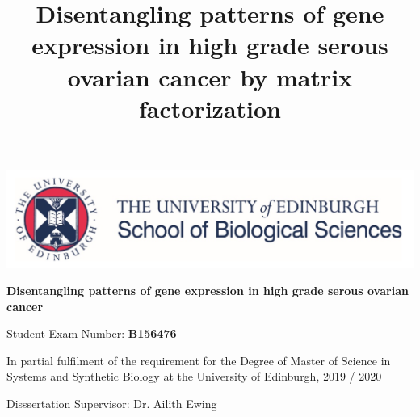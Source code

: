 \documentclass[draft, tikz, 12pt,a4paper,oneside,fleqn]{article}
\title{Disentangling patterns of gene expression in high grade serous ovarian cancer by matrix factorization}
\author{}
\begin{document}
\begin{center}
\begin{center}
\includegraphics[scale=0.3]{images/UoE_SBO_logo.png}
\end{center}

\vspace{0.3in}

\begin{mdframed}
\begin{center}
\huge
\vspace{0.3in}
\bf
Disentangling patterns of gene expression in high grade serous ovarian cancer
\vspace{0.2in}
\end{center}
\vspace{0.2in}
\end{mdframed}

\vspace{0.3in}

\begin{mdframed}
\begin{center}
\large
\vspace{0.2in}
Student Exam Number: \bf{B156476}
\vspace{0.2in}
\end{center}
\end{mdframed}

\vspace{0.3in}

\begin{mdframed}
\begin{center}
\large
\vspace{0.2in}
In partial fulfilment of the requirement for the Degree of
Master of Science in Systems and Synthetic Biology at the
University of Edinburgh,
2019 / 2020
\vspace{0.2in}
\end{center}
\end{mdframed}

\vspace{0.3in}

\begin{mdframed}
\begin{center}
\large
\vspace{0.2in}

Disssertation Supervisor:  Dr. Ailith Ewing
\vspace{0.2in}
\end{center}
\end{mdframed}
\end{center}
\end{document}
